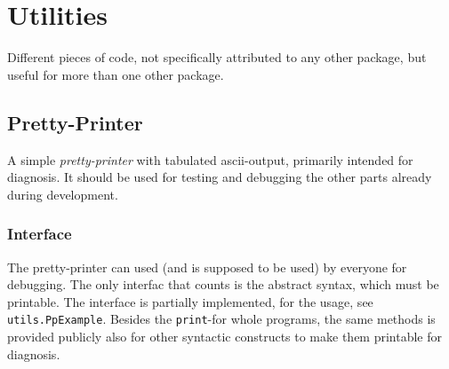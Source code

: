 \section{Utilities}
\label{sec:utils}

Different pieces of code, not specifically attributed to any other package,
but useful for more than one other package.


\subsection{Pretty-Printer}
\label{sec:prettyprinter}


A simple \emph{pretty-printer} with tabulated ascii-output, primarily intended
for diagnosis. It should be used for testing and debugging the other parts
already during development.


\subsubsection*{Interface}

The pretty-printer can used (and is supposed to be used) by everyone for
debugging. The only interfac that counts is the abstract syntax, which must be
printable. The interface is partially implemented, for the usage, see
\texttt{utils.PpExample}. Besides the \texttt{print}-for whole programs, the
same methods is provided publicly also for other syntactic constructs to make
them printable for diagnosis.

